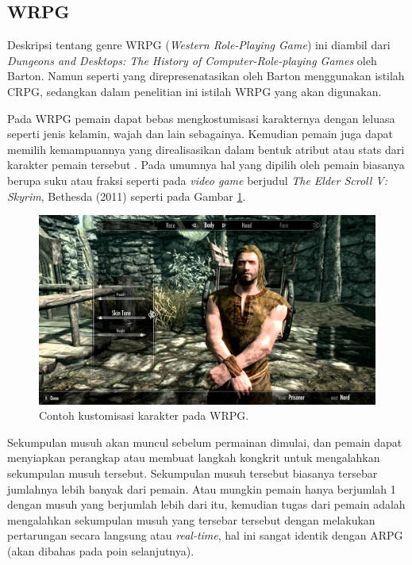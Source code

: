 \begin{subs}
	\subsection{WRPG}
	\label{sec:sub_sec2_wrpg}
	
	Deskripsi tentang genre WRPG (\textit{Western Role-Playing Game}) ini diambil dari \textit{Dungeons and Desktops: The History of Computer-Role-playing Games} oleh Barton. Namun seperti yang direpresenatasikan oleh Barton menggunakan istilah CRPG, sedangkan dalam penelitian ini istilah WRPG yang akan digunakan.
	\vspace{1ex}
	
	Pada WRPG pemain dapat bebas mengkostumisasi karakternya dengan leluasa seperti jenis kelamin, wajah dan lain sebagainya. Kemudian pemain juga dapat memilih kemampuannya yang direalisasikan dalam bentuk atribut atau stats dari karakter pemain tersebut \citep{barton2019}. Pada umumnya hal yang dipilih oleh pemain biasanya berupa suku atau fraksi seperti pada \textit{video game} berjudul \textit{The Elder Scroll V: Skyrim}, Bethesda (2011) seperti pada Gambar \ref{fig:skyrim}.
	\vspace{1ex}
	
	\begin{figure} [!h] \centering
		\includegraphics[scale=0.18]{img/skyrim.jpg}
		\caption{Contoh kustomisasi karakter pada WRPG.}
		\label{fig:skyrim}
	\end{figure}

	Sekumpulan musuh akan muncul sebelum permainan dimulai, dan pemain dapat menyiapkan perangkap atau membuat langkah kongkrit untuk mengalahkan sekumpulan  musuh tersebut. Sekumpulan musuh tersebut biasanya tersebar jumlahnya lebih banyak dari pemain. Atau mungkin pemain hanya berjumlah 1 dengan musuh yang berjumlah lebih dari itu, kemudian tugas dari pemain adalah mengalahkan sekumpulan musuh yang tersebar tersebut dengan melakukan pertarungan secara langsung atau \textit{real-time}, hal ini sangat identik dengan ARPG (akan dibahas pada poin selanjutnya).
	\vspace{1ex}
	

\end{subs}
